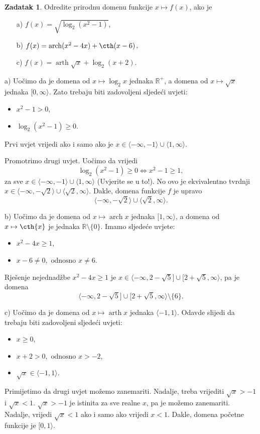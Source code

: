 \documentclass{book}
\DeclareMathOperator{\artanh}{arth}
\DeclareMathOperator{\arcosh}{arch}
\renewenvironment{proof}{%
    \vspace{-\parskip}\begin{oldproof}%
    }{%
    \end{oldproof}%
}
\theoremstyle{definition}
\theoremstyle{definition}
\newtheorem{exercise}{Zadatak}
\theoremstyle{remark}
\begin{document}
\begin{exercise}
Odredite prirodnu domenu funkcije $x\mapsto f(x)$, ako je
\begin{itemize}
\item[a)] $f(x)=\sqrt{\log_2(x^2-1)}$,
\item[b)] $f(x)=\arcosh(x^2-4x)+\cth(x-6)$,
\item[c)] $f(x)=\artanh{\sqrt{x}}+\log_2(x+2)$.
\end{itemize}
\end{exercise}
\begin{proof}[Rješenje]
a) Uočimo da je domena od $x\mapsto \log_2{x}$ jednaka $\mathbb{R}^+$, a domena od $x\mapsto \sqrt{x}$ jednaka $[0, \infty\rangle$. Zato trebaju biti zadovoljeni sljedeći uvjeti:
\begin{itemize}
\item $x^2-1>0$,
\item $\log_2(x^2-1)\geq 0$.
\end{itemize}
Prvi uvjet vrijedi ako i samo ako je $x\in \langle-\infty, -1\rangle\cup \langle 1, \infty\rangle$.

Promotrimo drugi uvjet. Uočimo da vrijedi $$\log_2(x^2-1)\geq 0\Leftrightarrow x^2-1\geq 1,$$
za sve $x\in \langle-\infty, -1\rangle\cup \langle 1, \infty\rangle$ (Uvjerite se u to!). No ovo je ekvivalentno tvrdnji $x\in \langle-\infty, -\sqrt{2}\rangle\cup \langle \sqrt{2}, \infty\rangle$. Dakle, domena funkcije $f$ je upravo $$\langle-\infty, -\sqrt{2}\rangle\cup \langle \sqrt{2}, \infty\rangle.$$

b) Uočimo da je domena od $x\mapsto \arcosh{x}$ jednaka $[1, \infty\rangle$, a domena od $x\mapsto \cth{x}$ je jednaka $\mathbb{R}\setminus\{0\}$. Imamo sljedeće uvjete:
\begin{itemize}
\item $x^2-4x\geq 1$,
\item $x-6\neq 0,\text{ odnosno } x\neq 6$.
\end{itemize}
Rješenje nejednadžbe $x^2-4x\geq 1$ je $x\in \langle -\infty, 2-\sqrt{5}]\cup [2+\sqrt{5}, \infty\rangle$, pa je domena
$$\langle -\infty, 2-\sqrt{5}]\cup [2+\sqrt{5}, \infty\rangle\setminus\{6\}.$$

c) Uočimo da je domena od $x\mapsto \artanh{x}$ jednaka $\langle -1, 1\rangle$. Odavde slijedi da trebaju biti zadovoljeni sljedeći uvjeti:
\begin{itemize}
\item $x\geq 0$,
\item $x+2>0,\text{ odnosno }x>-2$,
\item $\sqrt{x}\in \langle -1, 1\rangle$.
\end{itemize}
Primijetimo da drugi uvjet možemo zanemariti. Nadalje, treba vrijediti $\sqrt{x}>-1$ i $\sqrt{x}<1$. $\sqrt{x}>-1$ je istinita za sve realne $x$, pa je možemo zanemariti. Nadalje, vrijedi $\sqrt{x}<1$ ako i samo ako vrijedi $ x<1$. Dakle, domena početne funkcije je $[0, 1\rangle$.
\end{proof}
\end{document}
